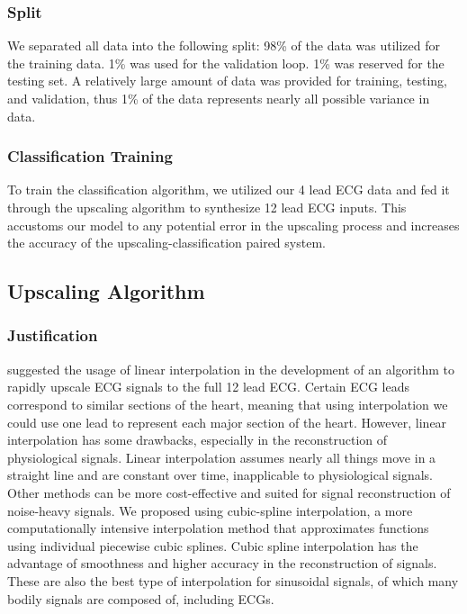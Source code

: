 \documentclass[
	a4paper, 
	10pt, 
	twoside, 
]{LTJournalArticle}
\begin{document}
\subsubsection{Split}
We separated all data into the following split: 98\% of the data was utilized for the training data. 1\% was used for the validation loop. 1\% was reserved for the testing set. A relatively large amount of data was provided for training, testing, and validation, thus 1\% of the data represents nearly all possible variance in data. 
\subsubsection{Classification Training}
To train the classification algorithm, we utilized our 4 lead ECG data and fed it through the upscaling algorithm to synthesize 12 lead ECG inputs. This accustoms our model to any potential error in the upscaling process and increases the accuracy of the upscaling-classification paired system. 
\subsection{Upscaling Algorithm}
\subsubsection{Justification}
\textcite{Jain2022} suggested the usage of linear interpolation in the development of an algorithm to rapidly upscale ECG signals to the full 12 lead ECG. Certain ECG leads correspond to similar sections of the heart, meaning that using interpolation we could use one lead to represent each major section of the heart. However, linear interpolation has some drawbacks, especially in the reconstruction of physiological signals. Linear interpolation assumes nearly all things move in a straight line and are constant over time, inapplicable to physiological signals. Other methods can be more cost-effective and suited for signal reconstruction of noise-heavy signals. We proposed using cubic-spline interpolation, a more computationally intensive interpolation method that approximates functions using individual piecewise cubic splines. Cubic spline interpolation has the advantage of smoothness and higher accuracy in the reconstruction of signals. These are also the best type of interpolation for sinusoidal signals, of which many bodily signals are composed of, including ECGs.  
\end{document}
